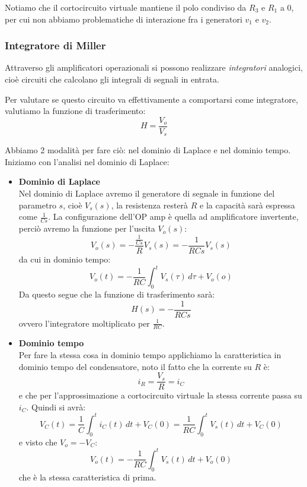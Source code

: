 \documentclass[a4paper,11pt]{article}
\begin{document}
Notiamo che il cortocircuito virtuale mantiene il polo condiviso da $R_3$ e $R_1$ a 0, per cui non abbiamo problematiche di interazione fra i generatori $v_1$ e $v_2$.

\subsubsection{Integratore di Miller}
Attraverso gli amplificatori operazionali si possono realizzare \textit{integratori} analogici, cioè circuiti che calcolano gli integrali di segnali in entrata.

\begin{center}
\end{center}

Per valutare se questo circuito va effettivamente a comportarsi come integratore, valutiamo la funzione di trasferimento:
$$
H = \frac{V_o}{V_s}
$$

Abbiamo 2 modalità per fare ciò: nel dominio di Laplace e nel dominio tempo. Iniziamo con l'analisi nel dominio di Laplace:
\begin{itemize}
\item \textbf{\textsf{Dominio di Laplace}} \\
	Nel dominio di Laplace avremo il generatore di segnale in funzione del parametro $s$, cioè $V_s(s)$, la resistenza resterà $R$ e la capacità sarà espressa come $\frac{1}{Cs}$. La configurazione dell'OP amp è quella ad amplificatore invertente, perciò avremo la funzione per l'uscita $V_o(s)$:
$$
V_o(s) = - \frac{\frac{1}{Cs}}{R} V_s(s) = - \frac{1}{RC s} V_s(s)
$$
da cui in dominio tempo:
$$
V_o(t) = -\frac{1}{RC} \int_0^t V_s(\tau) \, d\tau + V_o(o)
$$
Da questo segue che la funzione di trasferimento sarà:
$$
H(s) = -\frac{1}{RCs}
$$
ovvero l'integratore moltiplicato per $\frac{1}{RC}$.

\item \textbf{\textsf{Dominio tempo}} \\
Per fare la stessa cosa in dominio tempo applichiamo la caratteristica in dominio tempo del condensatore, noto il fatto che la corrente su $R$ è:
$$
i_R = \frac{V_s}{R} = i_C
$$
e che per l'approssimazione a cortocircuito virtuale la stessa corrente passa su $i_C$. Quindi si avrà:
$$
V_C(t) = \frac{1}{C} \int_0^t i_C(t) \, dt + V_C(0) = \frac{1}{RC} \int_0^t V_s(t) \, dt + V_C(0)
$$
e visto che $V_o = - V_C$:
$$
V_o(t) = - \frac{1}{RC} \int_0^t V_s(t) \, dt + V_o(0)
$$
che è la stessa caratteristica di prima.
\end{itemize}
\end{document}
